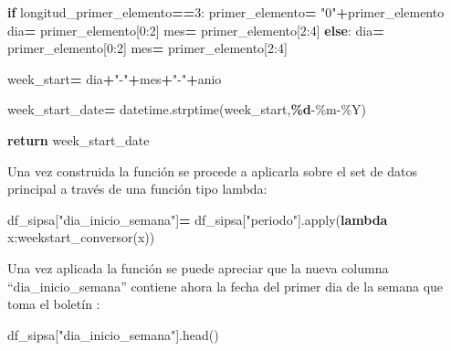 \documentclass[
]{book}
\newenvironment{Shaded}{\begin{snugshade}}{\end{snugshade}}
\newcommand{\BuiltInTok}[1]{#1}
\newcommand{\ControlFlowTok}[1]{\textcolor[rgb]{0.13,0.29,0.53}{\textbf{#1}}}
\newcommand{\DecValTok}[1]{\textcolor[rgb]{0.00,0.00,0.81}{#1}}
\newcommand{\KeywordTok}[1]{\textcolor[rgb]{0.13,0.29,0.53}{\textbf{#1}}}
\newcommand{\NormalTok}[1]{#1}
\newcommand{\OperatorTok}[1]{\textcolor[rgb]{0.81,0.36,0.00}{\textbf{#1}}}
\newcommand{\SpecialCharTok}[1]{\textcolor[rgb]{0.81,0.36,0.00}{\textbf{#1}}}
\newcommand{\StringTok}[1]{\textcolor[rgb]{0.31,0.60,0.02}{#1}}
\begin{document}
\begin{Shaded}
\begin{Highlighting}[]
        \ControlFlowTok{if}\NormalTok{ longitud\_primer\_elemento}\OperatorTok{==}\DecValTok{3}\NormalTok{:}
\NormalTok{            primer\_elemento}\OperatorTok{=} \StringTok{"0"}\OperatorTok{+}\NormalTok{primer\_elemento}
\NormalTok{            dia}\OperatorTok{=}\NormalTok{ primer\_elemento[}\DecValTok{0}\NormalTok{:}\DecValTok{2}\NormalTok{]}
\NormalTok{            mes}\OperatorTok{=}\NormalTok{ primer\_elemento[}\DecValTok{2}\NormalTok{:}\DecValTok{4}\NormalTok{]   }
        \ControlFlowTok{else}\NormalTok{:}
\NormalTok{            dia}\OperatorTok{=}\NormalTok{ primer\_elemento[}\DecValTok{0}\NormalTok{:}\DecValTok{2}\NormalTok{]}
\NormalTok{            mes}\OperatorTok{=}\NormalTok{ primer\_elemento[}\DecValTok{2}\NormalTok{:}\DecValTok{4}\NormalTok{]}
            
    
\NormalTok{    week\_start}\OperatorTok{=}\NormalTok{ dia}\OperatorTok{+}\StringTok{"{-}"}\OperatorTok{+}\NormalTok{mes}\OperatorTok{+}\StringTok{"{-}"}\OperatorTok{+}\NormalTok{anio}
    
\NormalTok{    week\_start\_date}\OperatorTok{=}\NormalTok{ datetime.strptime(week\_start,}\StringTok{\textquotesingle{}}\SpecialCharTok{\%d}\StringTok{{-}\%m{-}\%Y\textquotesingle{}}\NormalTok{)}

    
    \ControlFlowTok{return}\NormalTok{ week\_start\_date}
\end{Highlighting}
\end{Shaded}

Una vez construida la función se procede a aplicarla sobre el set de datos principal a través de una función tipo lambda:

\begin{Shaded}
\begin{Highlighting}[]

\NormalTok{df\_sipsa[}\StringTok{"dia\_inicio\_semana"}\NormalTok{]}\OperatorTok{=}\NormalTok{ df\_sipsa[}\StringTok{"periodo"}\NormalTok{].}\BuiltInTok{apply}\NormalTok{(}\KeywordTok{lambda}\NormalTok{ x:weekstart\_conversor(x))}
\end{Highlighting}
\end{Shaded}

Una vez aplicada la función se puede apreciar que la nueva columna ``dia\_inicio\_semana'' contiene ahora la fecha del primer dia de la semana que toma el boletín :

\begin{Shaded}
\begin{Highlighting}[]

\NormalTok{df\_sipsa[}\StringTok{"dia\_inicio\_semana"}\NormalTok{].head()}
\end{Highlighting}
\end{Shaded}
\end{document}
